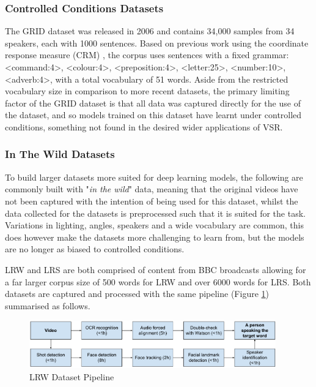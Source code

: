 \subsubsection{Controlled Conditions Datasets}
The GRID dataset was released in 2006 \cite{Cooke2006} and contains 34,000 samples from 34 speakers, each with 1000 sentences.
Based on previous work using the coordinate response measure (CRM) \cite{Bolia2000}, the corpus uses sentences with a fixed grammar: <command:4>, <colour:4>, <preposition:4>, <letter:25>, <number:10>, <adverb:4>, with a total vocabulary of 51 words.
Aside from the restricted vocabulary size in comparison to more recent datasets, the primary limiting factor of the GRID dataset is that all data was captured directly for the use of the dataset, and so models trained on this dataset have learnt under controlled conditions, something not found in the desired wider applications of VSR.

\subsubsection{In The Wild Datasets}
To build larger datasets more suited for deep learning models, the following are commonly built with "\textit{in the wild}" data, meaning that the original videos have not been captured with the intention of being used for this dataset, whilst the data collected for the datasets is preprocessed such that it is suited for the task.
Variations in lighting, angles, speakers and a wide vocabulary are common, this does however make the datasets more challenging to learn from, but the models are no longer as biased to controlled conditions.

LRW and LRS are both comprised of content from BBC broadcasts \cite{Chung2016, Chung2017} allowing for a far larger corpus size of 500 words for LRW and over 6000 words for LRS.
Both datasets are captured and processed with the same pipeline (Figure \ref{fig:LRW_Pipeline}) summarised as follows. 

\begin{figure}[h]
    \centering
        \includegraphics[width=0.95\textwidth]{figures/lrw_pipeline.png}
    \caption{LRW Dataset Pipeline \cite{Chung2016}}\label{fig:LRW_Pipeline}
\end{figure}

